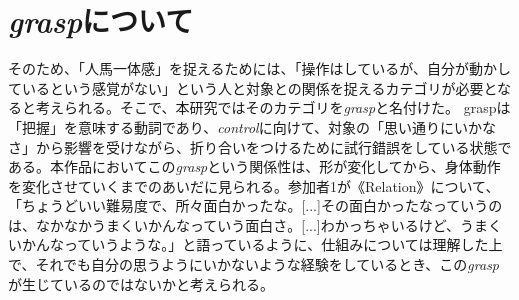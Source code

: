 

\section{\textit{grasp}について}
そのため、「人馬一体感」を捉えるためには、「操作はしているが、自分が動かしているという感覚がない」という人と対象との関係を捉えるカテゴリが必要となると考えられる。そこで、本研究ではそのカテゴリを\textit{grasp}と名付けた。
graspは「把握」を意味する動詞であり、\textit{control}に向けて、対象の「思い通りにいかなさ」から影響を受けながら、折り合いをつけるために試行錯誤をしている状態である。本作品においてこの\textit{grasp}という関係性は、形が変化してから、身体動作を変化させていくまでのあいだに見られる。参加者1が《Relation》について、「ちょうどいい難易度で、所々面白かったな。[...]その面白かったなっていうのは、なかなかうまくいかんなっていう面白さ。[...]わかっちゃいるけど、うまくいかんなっていうような。」と語っているように、仕組みについては理解した上で、それでも自分の思うようにいかないような経験をしているとき、この\textit{grasp}が生じているのではないかと考えられる。

